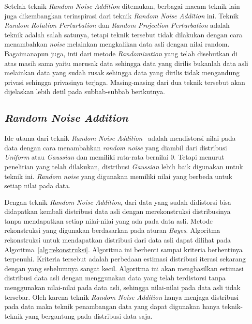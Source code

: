 Setelah teknik \textit{Random Noise Addition} ditemukan, berbagai macam teknik lain juga dikembangkan terinspirasi dari teknik \textit{Random Noise Addition} ini. Teknik \textit{Random Rotation Perturbation} dan \textit{Random Projection Perturbation} adalah teknik adalah salah satunya, tetapi teknik tersebut tidak dilakukan dengan cara menambahkan \textit{noise} melainkan mengkalikan data asli dengan nilai random. Bagaimanapun juga, inti dari metode \textit{Randomization} yang telah disebutkan di atas masih sama yaitu merusak data sehingga data yang dirilis bukanlah data asli melainkan data yang sudah rusak sehingga data yang dirilis tidak mengandung privasi sehingga privasinya terjaga. Masing-masing dari dua teknik tersebut akan dijelaskan lebih detil pada subbab-subbab berikutnya.

\subsection{\textit{Random Noise Addition}}
\label{subsec:rna}

Ide utama dari teknik \textit{Random Noise Addition}~\cite{agrawalsrikant:00:randomnoise} adalah mendistorsi nilai pada data dengan cara menambahkan \textit{random noise} yang diambil dari distribusi \textit{Uniform} atau \textit{Gaussian} dan memiliki rata-rata bernilai 0. Tetapi menurut penelitian yang telah dilakukan, distribusi \textit{Gaussian} lebih baik digunakan untuk teknik ini. \textit{Random noise} yang digunakan memiliki nilai yang berbeda untuk setiap nilai pada data.

Dengan teknik \textit{Random Noise Addition}, dari data yang sudah didistorsi bisa didapatkan kembali distribusi data asli dengan merekonstruksi distribusinya tanpa mendapatkan setiap nilai-nilai yang ada pada data asli. Metode rekonstruksi yang digunakan berdasarkan pada aturan \textit{Bayes}. Algoritma rekonstruksi untuk mendapatkan distribusi dari data asli dapat dilihat pada Algoritma~\ref{alg:rekonstruksi}. Algoritma ini berhenti sampai kriteria berhentinya terpenuhi. Kriteria tersebut adalah perbedaan estimasi distribusi iterasi sekarang dengan yang sebelumnya sangat kecil. Algoritma ini akan menghasilkan estimasi distribusi data asli dengan menggunakan data yang telah terdistorsi tanpa menggunakan nilai-nilai pada data asli, sehingga nilai-nilai pada data asli tidak tersebar. Oleh karena teknik \textit{Random Noise Addition} hanya menjaga distribusi pada data maka teknik penambangan data yang dapat digunakan hanya teknik-teknik yang bergantung pada distribusi data saja.

